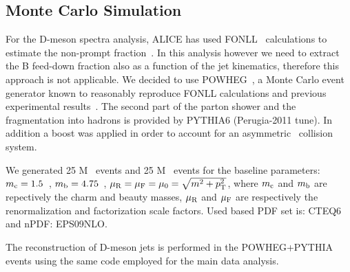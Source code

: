 \subsection{Monte Carlo Simulation}

For the D-meson spectra analysis, ALICE has used FONLL~\cite{Cacciari:1998} calculations to estimate the non-prompt fraction~\cite{ALICE:2012d, ALICE:2014d, ALICE:2016a}.
In this analysis however we need to extract the B feed-down fraction also as a function of the jet kinematics, therefore this approach is not applicable.
We decided to use POWHEG~\cite{Alioli:2010}, a Monte Carlo event generator known to reasonably reproduce FONLL calculations and previous experimental results~\cite{Cacciari:2012b}.
The second part of the parton shower and the fragmentation into hadrons is provided by PYTHIA6 (Perugia-2011 tune). In addition a boost was applied in order to account for an asymmetric \pPb\ collision system. 

We generated 25 M \ccbar\ events and 25 M \bbbar\ events for the baseline parameters: 
$m_{\rm c} = 1.5$~\GeVcsq, $m_{\rm b} = 4.75$~\GeVcsq, $\mu_{\rm R} = \mu_{\rm F} =\mu_{0} = \sqrt{m^2+p_{\rm T}^2}$,
where $m_{\rm c}$ and $m_{\rm b}$ are repectively the charm and beauty masses, $\mu_{\rm R}$ and $\mu_{\rm F}$ are respectively the renormalization and factorization scale factors.  Used based PDF set is: CTEQ6 and nPDF: EPS09NLO.

The reconstruction of D-meson jets is performed in the POWHEG+PYTHIA events using the same code employed for the main data analysis.


